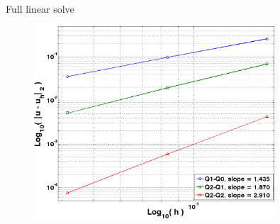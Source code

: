 \documentclass[8pt,xcolor=svgnames]{beamer}
\begin{document}
\begin{frame}
\begin{columns}
\begin{column}{0.4\textwidth}
\begin{figure}[h!]
  \end{figure}
  \centering
  \small{Full linear solve}
  \begin{figure}[h!]
    \centering
    \includegraphics[width=0.8\textwidth,keepaspectratio=true]{./Images/GradPError_FullMass.png}
  \end{figure}
  \end{column}
 \end{columns}

\end{frame}
\end{document}
